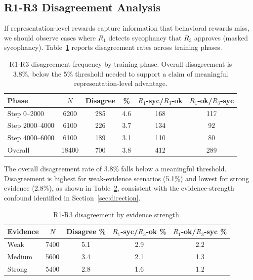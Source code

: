 \documentclass[11pt,a4paper]{article}
\begin{document}
\subsection{R1-R3 Disagreement Analysis}
\label{sec:disagreement}

If representation-level rewards capture information that behavioral rewards miss, we should observe cases where $R_1$ detects sycophancy that $R_3$ approves (masked sycophancy). Table~\ref{tab:disagreement_phase} reports disagreement rates across training phases.

\begin{table}[h]
\centering
\caption{R1-R3 disagreement frequency by training phase. Overall disagreement is 3.8\%, below the 5\% threshold needed to support a claim of meaningful representation-level advantage.}
\label{tab:disagreement_phase}
\small
\begin{tabular}{lccccc}
\toprule
Phase & $N$ & Disagree & \% & $R_1$-syc/$R_3$-ok & $R_1$-ok/$R_3$-syc \\
\midrule
Step 0--2000    & 6200  & 285 & 4.6 & 168 & 117 \\
Step 2000--4000 & 6100  & 226 & 3.7 & 134 & 92 \\
Step 4000--6000 & 6100  & 189 & 3.1 & 110 & 80 \\
\midrule
Overall         & 18400 & 700 & 3.8 & 412 & 289 \\
\bottomrule
\end{tabular}
\end{table}

The overall disagreement rate of 3.8\% falls below a meaningful threshold. Disagreement is highest for weak-evidence scenarios (5.1\%) and lowest for strong evidence (2.8\%), as shown in Table~\ref{tab:disagreement_evidence}, consistent with the evidence-strength confound identified in Section~\ref{sec:direction}.

\begin{table}[h]
\centering
\caption{R1-R3 disagreement by evidence strength.}
\label{tab:disagreement_evidence}
\small
\begin{tabular}{lcccc}
\toprule
Evidence & $N$ & Disagree \% & $R_1$-syc/$R_3$-ok \% & $R_1$-ok/$R_3$-syc \% \\
\midrule
Weak   & 7400 & 5.1 & 2.9 & 2.2 \\
Medium & 5600 & 3.4 & 2.1 & 1.3 \\
Strong & 5400 & 2.8 & 1.6 & 1.2 \\
\bottomrule
\end{tabular}
\end{table}
\end{document}
